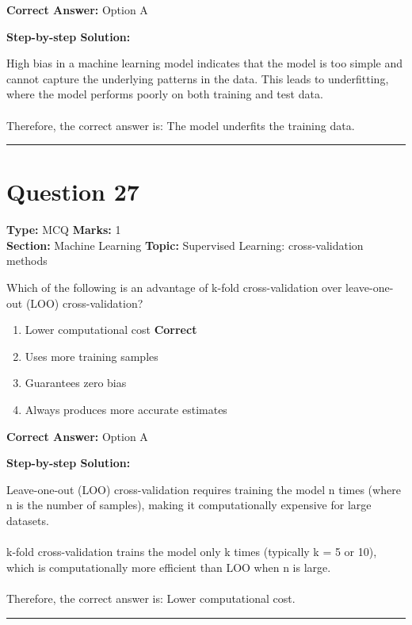 \documentclass[11pt]{article}
\begin{document}
\textbf{Correct Answer:} Option A

\textbf{Step-by-step Solution:}

High bias in a machine learning model indicates that the model is too simple and cannot capture the underlying patterns in the data. This leads to underfitting, where the model performs poorly on both training and test data.\\
\\
Therefore, the correct answer is: The model underfits the training data.

\vspace{0.8em}
\hrule
\vspace{0.4em}
\section*{Question 27}
\textbf{Type:} MCQ \hfill \textbf{Marks:} 1\\
\textbf{Section:} Machine Learning \hfill \textbf{Topic:} Supervised Learning: cross-validation methods

Which of the following is an advantage of k-fold cross-validation over leave-one-out (LOO) cross-validation?


\begin{enumerate}[label=\textbf{\Alph*.}, leftmargin=1.8em]
\item Lower computational cost \hfill {\color{gategreen}\textbf{Correct}}\item Uses more training samples\item Guarantees zero bias\item Always produces more accurate estimates\end{enumerate}

\textbf{Correct Answer:} Option A

\textbf{Step-by-step Solution:}

Leave-one-out (LOO) cross-validation requires training the model n times (where n is the number of samples), making it computationally expensive for large datasets.\\
\\
k-fold cross-validation trains the model only k times (typically k = 5 or 10), which is computationally more efficient than LOO when n is large.\\
\\
Therefore, the correct answer is: Lower computational cost.

\vspace{0.8em}
\hrule
\vspace{0.4em}
\end{document}
